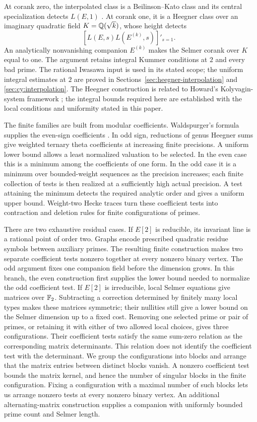 At corank zero, the interpolated class is a Beilinson--Kato class and
its central specialization detects $L(E,1)$ \citep{Kato2004}.
At corank one, it is a Heegner class over an imaginary quadratic field
$K=\mathbb Q(\sqrt{k})$,
whose height detects
\[
 \left[L(E,s)L(E^{(k)},s)\right]'_{s=1}.
\]
An analytically nonvanishing companion $E^{(k)}$ makes the Selmer
corank over $K$ equal to one. The argument retains integral Kummer
conditions at $2$ and every bad prime. The rational Iwasawa input is
used in its stated scope; the uniform integral estimates at $2$ are
proved in Sections~\ref{sec:heegner-interpolation} and
\ref{sec:cy:interpolation}. The Heegner construction is related to
Howard's Kolyvagin-system framework \citep{Howard2012}; the integral
bounds required here are established with the local conditions and
uniformity stated in this paper.

The finite families are built from modular coefficients. Waldspurger's
formula supplies the even-sign coefficients \citep{Waldspurger1981}.
In odd sign, reductions
of genus Heegner sums give weighted ternary theta coefficients at
increasing finite precisions. A uniform lower bound allows a least
normalized valuation to be selected. In the even case this is a minimum
among the coefficients of one form. In the odd case it is a minimum
over bounded-weight sequences as the precision increases; each finite
collection of tests is then realized at a sufficiently high actual
precision. A test attaining the minimum detects the required analytic
order and gives a uniform upper bound. Weight-two Hecke traces turn these coefficient
tests into contraction and deletion rules for finite configurations
of primes.

There are two exhaustive residual cases. If $E[2]$ is reducible, its
invariant line is a rational point of order two. Graphs encode prescribed
quadratic residue symbols between auxiliary primes. The resulting finite
construction makes two separate coefficient tests nonzero together at
every nonzero binary vertex. The odd argument fixes one companion field
before the dimension grows. In this branch, the even construction first
supplies the lower bound needed to normalize the odd coefficient test.
If $E[2]$ is irreducible, local Selmer equations give matrices over
$\mathbb F_2$. Subtracting a correction determined by finitely many local types
makes these matrices symmetric; their nullities still give a lower
bound on the Selmer dimension up to a fixed cost. Removing one selected prime or pair of primes, or retaining
it with either of two allowed local choices, gives three configurations.
Their coefficient tests satisfy the same sum-zero relation as the
corresponding matrix determinants. This relation does not identify the
coefficient test with the determinant.
We group the configurations into blocks and arrange that the matrix
entries between distinct blocks vanish.
A nonzero coefficient test bounds the matrix kernel, and hence the number
of singular blocks in the finite configuration. Fixing a configuration
with a maximal number of such blocks lets us arrange nonzero tests at
every nonzero binary vertex. An additional alternating-matrix construction
supplies a companion with uniformly bounded prime count and Selmer length.

